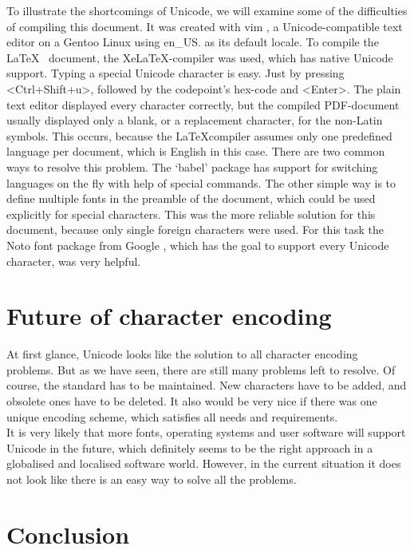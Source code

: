 \documentclass[a4paper, 12pt]{scrartcl} %
\begin{document}
To illustrate the shortcomings of Unicode, we will examine some of the
difficulties of compiling this document. It was created with vim \cite{vim}, a
Unicode-compatible text editor on a Gentoo Linux \cite{gentoo} using
en\_US. as its default locale. To compile the \LaTeX~
document, the XeLaTeX-compiler \cite{xelatex} was used, which has native
Unicode support. Typing a special Unicode character is easy. Just by pressing
<Ctrl+Shift+u>, followed by the \gls{codepoint}'s hex-code and <Enter>. The
plain text editor displayed every character correctly, but the compiled
PDF-document usually displayed only a blank, or a replacement character, for
the non-Latin symbols. This occurs, because the \LaTeX compiler assumes only
one predefined language per document, which is English in this case. There are
two common ways to resolve this problem. The `babel' package has support for
switching languages on the fly with help of special commands. The other simple
way is to define multiple fonts in the preamble of the document, which could be
used explicitly for special characters. This was the more reliable solution for
this document, because only single foreign characters were used.  For this task
the Noto font package from Google \cite{noto}, which has the goal to support
every Unicode character, was very helpful.

\section{Future of character encoding}

At first glance, Unicode looks like the solution to all character encoding
problems. But as we have seen, there are still many problems left to resolve.
Of course, the standard has to be maintained. New characters have to be added,
and obsolete ones have to be deleted. It also would be very nice if there was
one unique encoding scheme, which satisfies all needs and requirements. \\
It is very likely that more fonts, operating systems and user software will
support Unicode in the future, which definitely seems to be the right approach in
a globalised and localised software world. However, in the current situation it does
not look like there is an easy way to solve all the problems.

\section{Conclusion}
\end{document}
